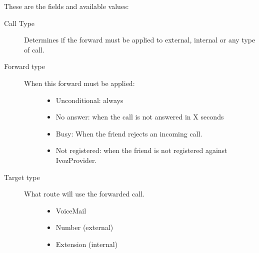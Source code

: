 \documentclass[letterpaper,10pt,spanish]{sphinxmanual}
\begin{document}
These are the fields and available values:
\begin{description}
\item[{Call Type}] \leavevmode{}\label{administration_portal/client/vpbx/routing_endpoints/friends/index:term-call-type}
Determines if the forward must be applied to external, internal or any
type of call.

\item[{Forward type}] \leavevmode{}\label{administration_portal/client/vpbx/routing_endpoints/friends/index:term-forward-type}\begin{description}
\item[{When this forward must be applied:}] \leavevmode\begin{itemize}
\item {} 
Unconditional: always

\item {} 
No answer: when the call is not answered in X seconds

\item {} 
Busy: When the friend rejects an incoming call.

\item {} 
Not registered: when the friend is not registered against IvozProvider.

\end{itemize}

\end{description}

\item[{Target type}] \leavevmode{}\label{administration_portal/client/vpbx/routing_endpoints/friends/index:term-target-type}\begin{description}
\item[{What route will use the forwarded call.}] \leavevmode\begin{itemize}
\item {} 
VoiceMail

\item {} 
Number (external)

\item {} 
Extension (internal)

\end{itemize}

\end{description}

\end{description}
\end{document}
